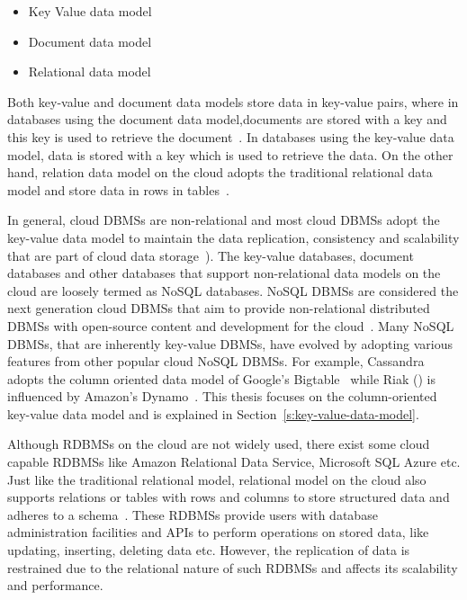 \begin{itemize}
\item Key Value data model 

\item Document data model 

\item Relational data model
\end{itemize}

Both key-value and document data models store data in key-value pairs, where in
databases using the document data model,documents are stored with a key and this
key is used to retrieve the document~\citep{rahien}. In databases using the
key-value data model, data is stored with a key which is used to retrieve the
data. On the other hand, relation data model on the cloud adopts the traditional
relational data model and store data in rows in tables~\citep{azure}.

In general, cloud \acp{DBMS} are non-relational and most cloud \acp{DBMS} adopt
the key-value data model to maintain the data replication,   consistency and
scalability that are part of cloud data storage~\citep{Abadi,Stonebraker}). The
key-value databases, document databases and other databases that support
non-relational data models on the cloud are loosely termed as \ac{NoSQL}
databases.  \ac{NoSQL} \acp{DBMS} are considered the next generation cloud
\acp{DBMS} that aim to provide non-relational distributed \acp{DBMS} with
open-source content and development for the cloud~\citep{Stonebraker}. Many
\ac{NoSQL} \acp{DBMS}, that are inherently key-value \acp{DBMS},   have evolved
by adopting various features from other popular cloud \ac{NoSQL} \acp{DBMS}.
For example, Cassandra adopts the column oriented data model of Google's
Bigtable~\citep{bigtable} while Riak () is influenced by Amazon's
Dynamo~\citep{Dynamo}. This thesis focuses on the column-oriented key-value data
model and is explained in Section~\ref{s:key-value-data-model}.

Although \acp{RDBMS} on the cloud are not widely used,   there exist some cloud
capable \acp{RDBMS} like Amazon Relational Data Service,   Microsoft SQL Azure
etc.  Just like the traditional relational model,   relational model on the
cloud also supports relations or tables with rows and columns to store
structured data and adheres to a schema~\citep{campbell,azure}.  These
\acp{RDBMS} provide users with database administration facilities and \acp{API}
to perform operations on stored data,   like updating,   inserting,   deleting
data etc. However,   the replication of data is restrained due to the relational
nature of such \acp{RDBMS} and affects its scalability and performance.



